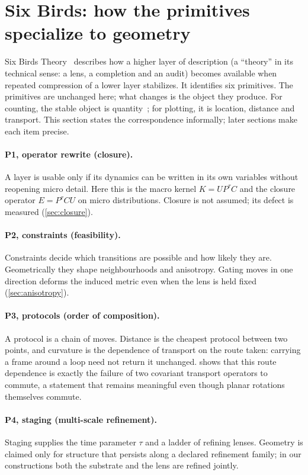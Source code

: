 \section{Six Birds: how the primitives specialize to geometry}
\label{sec:six-birds}

Six Birds Theory~\cite{SixBirdsTheory} describes how a higher layer of description (a ``theory'' in its technical sense: a lens, a completion and an audit) becomes available when repeated compression of a lower layer stabilizes.
It identifies six primitives.
The primitives are unchanged here; what changes is the object they produce.
For counting, the stable object is quantity~\cite{ToCountAStone}; for plotting, it is location, distance and transport.
This section states the correspondence informally; later sections make each item precise.

\paragraph{P1, operator rewrite (closure).}
A layer is usable only if its dynamics can be written in its own variables without reopening micro detail.
Here this is the macro kernel $K=UP^{\tau}C$ and the closure operator $E=P^{\tau}CU$ on micro distributions.
Closure is not assumed; its defect is measured (\cref{sec:closure}).

\paragraph{P2, constraints (feasibility).}
Constraints decide which transitions are possible and how likely they are.
Geometrically they shape neighbourhoods and anisotropy.
Gating moves in one direction deforms the induced metric even when the lens is held fixed (\cref{sec:anisotropy}).

\paragraph{P3, protocols (order of composition).}
A protocol is a chain of moves.
Distance is the cheapest protocol between two points, and curvature is the dependence of transport on the route taken: carrying a frame around a loop need not return it unchanged.
 shows that this route dependence is exactly the failure of two covariant transport operators to commute, a statement that remains meaningful even though planar rotations themselves commute.

\paragraph{P4, staging (multi-scale refinement).}
Staging supplies the time parameter $\tau$ and a ladder of refining lenses.
Geometry is claimed only for structure that persists along a declared refinement family; in our constructions both the substrate and the lens are refined jointly.

